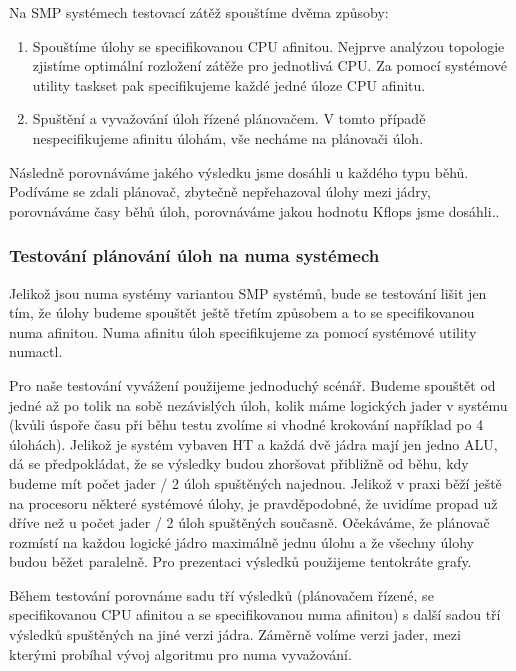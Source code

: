 \documentclass[
  field=ainfk,
  biblatex,
  glossaries,
  index
]{kidiplom}
\begin{document}
\noindent
Na SMP systémech testovací zátěž spouštíme dvěma způsoby:
\begin{enumerate}
\item Spouštíme úlohy se specifikovanou CPU afinitou. Nejprve analýzou topologie zjistíme optimální rozložení zátěže pro jednotlivá CPU. Za pomocí systémové utility taskset pak specifikujeme každé jedné úloze CPU afinitu.  
\item Spuštění a vyvažování úloh řízené plánovačem. V tomto případě nespecifikujeme afinitu úlohám, vše necháme na plánovači úloh.
\end{enumerate}

Následně porovnáváme jakého výsledku jsme dosáhli u každého typu běhů. Podíváme se zdali plánovač, zbytečně nepřehazoval úlohy mezi jádry, porovnáváme časy běhů úloh, porovnáváme jakou hodnotu Kflops jsme dosáhli..

\subsubsection{Testování plánování úloh na numa systémech}

Jelikož jsou numa systémy variantou SMP systémů, bude se testování lišit jen tím, že úlohy budeme spouštět ještě třetím způsobem a to se specifikovanou numa afinitou. Numa afinitu úloh specifikujeme za pomocí systémové utility numactl.

Pro naše testování vyvážení použijeme jednoduchý scénář. Budeme spouštět od jedné až po tolik na sobě nezávislých úloh, kolik máme logických jader v systému (kvůli úspoře času při běhu testu zvolíme si vhodné krokování například po 4 úlohách). Jelikož je systém vybaven HT a každá dvě jádra mají jen jedno ALU, dá se předpokládat, že se výsledky budou zhoršovat přibližně od běhu, kdy budeme mít počet jader / 2 úloh spuštěných najednou. Jelikož v praxi běží ještě na procesoru některé systémové úlohy, je pravděpodobné, že uvidíme propad už dříve než u počet jader / 2 úloh spuštěných současně. Očekáváme, že plánovač rozmístí na každou logické jádro maximálně jednu úlohu a že všechny úlohy budou běžet paralelně. Pro prezentaci výsledků použijeme tentokráte grafy.

Během testování porovnáme sadu tří výsledků (plánovačem řízené, se specifikovanou CPU afinitou a se specifikovanou numa afinitou) s další sadou tří výsledků spuštěných na jiné verzi jádra. Záměrně volíme verzi jader, mezi kterými probíhal vývoj algoritmu pro numa vyvažování.
\end{document}

